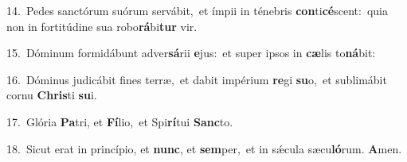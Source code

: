 {\numbfont\textcolor{\numbcolor}{14.}}~Pedes sanctórum suórum servábit,~\dagger et ímpii in ténebris \textbf{con}\-ti\-\textbf{cé}\-scent:~\star quia non in fortitúdine sua robo\-\textbf{rá}\-bi\textbf{tur} vir.\par
{\numbfont\textcolor{\numbcolor}{15.}}~Dóminum formidábunt adver\-\textbf{sá}\-rii \textbf{e}\-jus:~\star et super ipsos in \textbf{cæ}\-lis to\-\textbf{ná}\-bit:\par
{\numbfont\textcolor{\numbcolor}{16.}}~Dóminus judicábit fines terræ,~\dagger et dabit impérium \textbf{re}\-gi \textbf{su}\-o,~\star et sublimábit cornu \textbf{Chris}\-ti \textbf{su}\-i.\par
{\numbfont\textcolor{\numbcolor}{17.}}~Glória \textbf{Pa}\-tri, et \textbf{Fí}\-lio,~\star et Spi\-\textbf{rí}\-tui \textbf{Sanc}\-to.\par
{\numbfont\textcolor{\numbcolor}{18.}}~Sicut erat in princípio, et \textbf{nunc}\-, et \textbf{sem}\-per,~\star et in sǽcula sæcu\-\textbf{ló}\-rum. \textbf{A}\-men.\par
